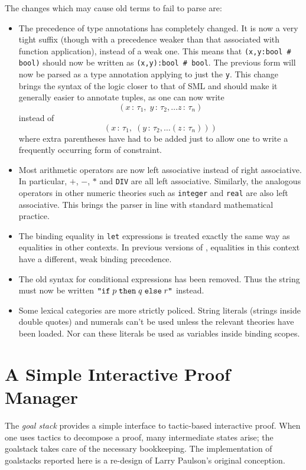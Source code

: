 The changes which may cause old terms to fail to parse are:
\begin{itemize}
\newcommand\condexp{\holtxt{$p$ => $q$ | $r$}}
\item The precedence of type annotations has completely changed.  It
  is now a very tight suffix (though with a precedence weaker than
  that associated with function application), instead of a weak one.
  This means that \mbox{\tt (x,y:bool \# bool)} should now be written
  as \mbox{\tt (x,y):bool \# bool}. The previous form will now be
  parsed as a type annotation applying to just the \verb+y+.  This
  change brings the syntax of the logic closer to that of SML and
  should make it generally easier to annotate tuples, as one can now
  write \[ (x\,:\,\tau_1,\;y\,:\,\tau_2,\dots z\,:\,\tau_n)
  \] instead of \[
  (x\,:\,\tau_1, \;(y\,:\,\tau_2, \dots (z\,:\,\tau_n)))
  \] where extra parentheses have had to be added just to allow one to
  write a frequently occurring form of constraint.
\item Most arithmetic operators are now left associative instead of
  right associative.  In particular, $+$, $-$, $*$ and {\tt DIV} are
  all left associative.  Similarly, the analogous operators in other
  numeric theories such as {\tt integer} and {\tt real} are also left
  associative.  This brings the \HOL{} parser in line with standard
  mathematical practice.
\item The binding equality in {\tt let} expressions is treated exactly
  the same way as equalities in other contexts.  In previous versions
  of \HOL, equalities in this context have a different, weak binding
  precedence.
\item The old syntax for conditional expressions has been
  removed. Thus the string \holquote{\condexp} must now be written
  $\holquote{\texttt{if}\;p\;\texttt{then}\;q\;\texttt{else}\;r}$
  instead.
\item Some lexical categories are more strictly policed.  String
  literals (strings inside double quotes) and numerals can't be used
  unless the relevant theories have been loaded.  Nor can these
  literals be used as variables inside binding scopes.
\end{itemize}


\section{A Simple Interactive Proof Manager}\label{sec:goalstack}

The \emph{goal stack} provides a simple interface to tactic-based
interactive proof. When one uses tactics to decompose a proof, many
intermediate states arise; the goalstack takes care of the necessary
bookkeeping. The implementation of goalstacks reported here is a
re-design of Larry Paulson's original conception.

